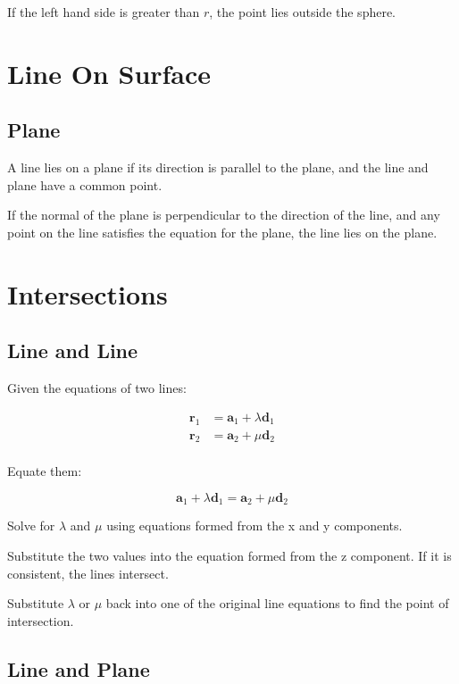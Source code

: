 \documentclass[a4paper,11pt]{article}
\newcommand{\bb}{\boldsymbol}
\begin{document}
If the left hand side is greater than $r$, the point lies outside the sphere.




\section{Line On Surface}

\subsection{Plane}

A line lies on a plane if its direction is parallel to the plane, and the line
and plane have a common point.

If the normal of the plane is perpendicular to the direction of the line, and
any point on the line satisfies the equation for the plane, the line lies on
the plane.




\section{Intersections}

\subsection{Line and Line}

Given the equations of two lines:

$$
\begin{aligned}
\bb{r}_1 & = \bb{a}_1 + \lambda \bb{d}_1 \\
\bb{r}_2 & = \bb{a}_2 + \mu \bb{d}_2 \\
\end{aligned}
$$

Equate them:

$$
\bb{a}_1 + \lambda \bb{d}_1 = \bb{a}_2 + \mu \bb{d}_2
$$

Solve for $\lambda$ and $\mu$ using equations formed from the x and y
components.

Substitute the two values into the equation formed from the z component. If it
is consistent, the lines intersect.

Substitute $\lambda$ or $\mu$ back into one of the original line equations to
find the point of intersection.


\subsection{Line and Plane}
\end{document}

